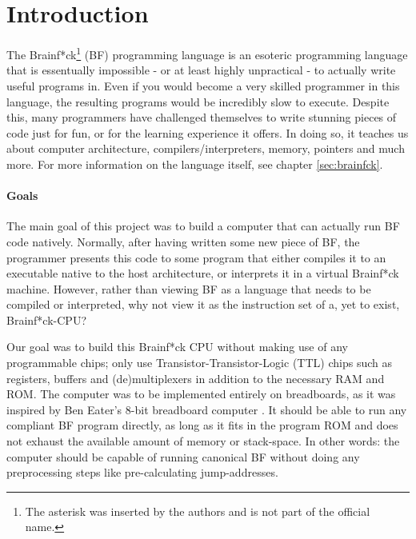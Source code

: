 \section{Introduction} \label{sec:introduction}
The Brainf*ck\footnote{The asterisk was inserted by the authors and is not part of the official name.} (BF) programming language is an esoteric programming language that is essentually impossible - or at least highly unpractical - to actually write useful programs in. Even if you would become a very skilled programmer in this language, the resulting programs would be incredibly slow to execute. Despite this, many programmers have challenged themselves to write stunning pieces of code just for fun, or for the learning experience it offers. In doing so, it teaches us about computer architecture, compilers/interpreters, memory, pointers and much more. For more information on the language itself, see chapter \ref{sec:brainfck}.

\paragraph{Goals} The main goal of this project was to build a computer that can actually run BF code natively. Normally, after having written some new piece of BF, the programmer presents this code to some program that either compiles it to an executable native to the host architecture, or interprets it in a virtual Brainf*ck machine. However, rather than viewing BF as a language that needs to be compiled or interpreted, why not view it as the instruction set of a, yet to exist, Brainf*ck-CPU?

Our goal was to build this Brainf*ck CPU without making use of any programmable chips; only use Transistor-Transistor-Logic (TTL) chips such as registers, buffers and (de)multiplexers in addition to the necessary RAM and ROM. The computer was to be implemented entirely on breadboards, as it was inspired by Ben Eater's 8-bit breadboard computer \cite{beneater}. It should be able to run any compliant BF program directly, as long as it fits in the program ROM and does not exhaust the available amount of memory or stack-space. In other words: the computer should be capable of running canonical BF without doing any preprocessing steps like pre-calculating jump-addresses.

